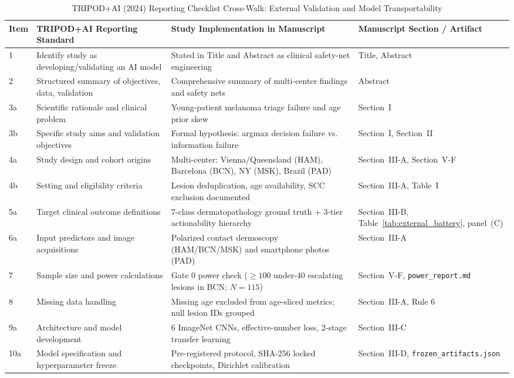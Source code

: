\begin{table}[t]
\caption{TRIPOD+AI (2024) Reporting Checklist Cross-Walk: External Validation and Model Transportability}
\label{tab:tripod_ai}
\centering
\scriptsize
\begin{tabular}{lp{5.5cm}p{6.0cm}l}
\toprule
\textbf{Item} & \textbf{TRIPOD+AI Reporting Standard} & \textbf{Study Implementation in Manuscript} & \textbf{Manuscript Section / Artifact} \\
\midrule
1 & Identify study as developing/validating an AI model & Stated in Title and Abstract as clinical safety-net engineering & Title, Abstract \\
2 & Structured summary of objectives, data, validation & Comprehensive summary of multi-center findings and safety nets & Abstract \\
3a & Scientific rationale and clinical problem & Young-patient melanoma triage failure and age prior skew & Section~I \\
3b & Specific study aims and validation objectives & Formal hypothesis: argmax decision failure vs. information failure & Section~I, Section~II \\
4a & Study design and cohort origins & Multi-center: Vienna/Queensland (HAM), Barcelona (BCN), NY (MSK), Brazil (PAD) & Section~III-A, Section~V-F \\
4b & Setting and eligibility criteria & Lesion deduplication, age availability, SCC exclusion documented & Section~III-A, Table~I \\
5a & Target clinical outcome definitions & 7-class dermatopathology ground truth + 3-tier actionability hierarchy & Section~III-B, Table~\ref{tab:external_battery}, panel~(C) \\
6a & Input predictors and image acquisitions & Polarized contact dermoscopy (HAM/BCN/MSK) and smartphone photos (PAD) & Section~III-A \\
7 & Sample size and power calculations & Gate 0 power check ($\ge 100$ under-40 escalating lesions in BCN; $N=115$) & Section~V-F, \texttt{power\_report.md} \\
8 & Missing data handling & Missing age excluded from age-sliced metrics; null lesion IDs grouped & Section~III-A, Rule 6 \\
9a & Architecture and model development & 6 ImageNet CNNs, effective-number loss, 2-stage transfer learning & Section~III-C \\
10a & Model specification and hyperparameter freeze & Pre-registered protocol, SHA-256 locked checkpoints, Dirichlet calibration & Section~III-D, \texttt{frozen\_artifacts.json} \\

\end{tabular}
\end{table}
